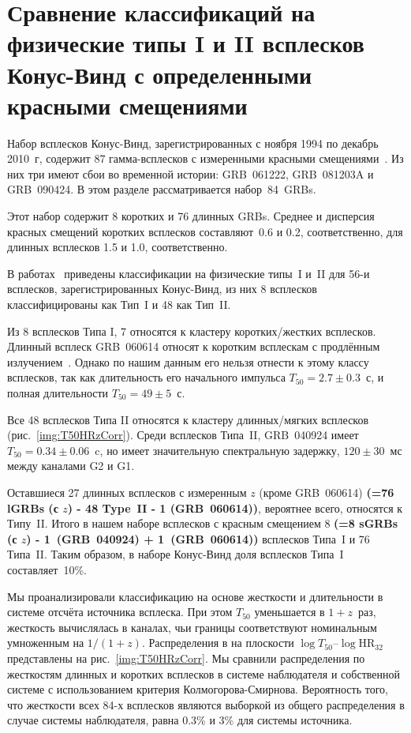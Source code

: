 \clearpage

\section{Сравнение классификаций на физические типы I и II всплесков Конус-Винд с определенными красными смещениями}\label{sec:Phis_Classification}
Набор всплесков Конус-Винд, зарегистрированных с ноября 1994 по декабрь 2010~г, содержит 87 гамма-всплесков с измеренными красными смещениями~\citep{Tsvetkova_2014}. Из них три имеют сбои во временной истории: GRB~061222, GRB~081203A и GRB~090424. В этом разделе рассматривается набор~84~GRBs.

Этот набор содержит 8 коротких и 76 длинных GRBs. Среднее и дисперсия красных смещений коротких всплесков составляют~0.6 и 0.2, соответственно, для длинных всплесков 1.5 и 1.0, соответственно.

В работах~\citet{Zhang_2009, Kann_2010, Kann_2011} приведены классификации на физические типы~I и~II для 56-и всплесков, зарегистрированных Конус-Винд, из них 8 всплесков классифицированы как Тип~I и 48 как Тип~II. 

Из 8 всплесков Типа I, 7 относятся к кластеру коротких/жестких всплесков. Длинный всплеск GRB~060614 относят к коротким всплескам с продлённым излучением~\citep{Gehrels_2006_Nature}. Однако по нашим данным его нельзя отнести к этому классу всплесков, так как длительность его начального импульса $T_{50} = 2.7\pm 0.3$~с, и полная длительности $T_{50} = 49 \pm 5$~с.

Все 48 всплесков Типа II относятся к кластеру длинных/мягких всплесков (рис.~\ref{img:T50HRzCorr}). Среди всплесков Типа~II, GRB~040924 имеет $T_{50} = 0.34\pm0.06$~c, но имеет значительную спектральную задержку, $120 \pm 30$~мс между каналами G2 и G1.

Оставшиеся 27 длинных всплесков с измеренным $z$ (кроме GRB~060614) \textbf{(=76 lGRBs (с $z$) - 48 Type~II - 1 (GRB~060614))}, вероятнее всего, относятся к Типу~II. Итого в нашем наборе всплесков с красным смещением 8 \textbf{(=8 sGRBs (с $z$) - 1~(GRB~040924) + 1~(GRB~060614))} всплесков Типа~I и 76 Типа~II. Таким образом, в наборе Конус-Винд доля всплесков Типа~I составляет~10\%.

Мы проанализировали классификацию на основе жесткости и длительности в системе отсчёта источника всплеска. При этом $T_{50}$ уменьшается в $1+z$~раз, жесткость вычислялась в каналах, чьи границы соответствуют номинальным умноженным на $1/(1+z)$. Распределения в на плоскости $\log T_{50}$--$\log \mbox{HR}_{32}$ представлены на рис.~\ref{img:T50HRzCorr}.  Мы сравнили распределения по жесткостям длинных и коротких всплесков в системе наблюдателя и собственной системе с использованием критерия Колмогорова-Смирнова. Вероятность того, что жесткости всех 84-х всплесков являются выборкой из общего распределения в случае системы наблюдателя, равна 0.3\% и 3\% для системы источника.  

